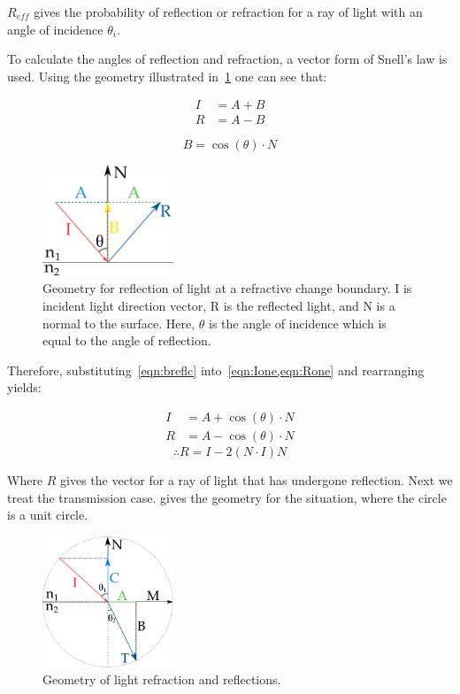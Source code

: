 \begin{appendices}
$R_{eff}$ gives the probability of reflection or refraction for a ray of light with an angle of incidence $\theta_i$.


To calculate the angles of reflection and refraction, a vector form of Snell's law is used.
Using the geometry illustrated in~\cref{fig:reflcfig} one can see that:

\begin{align}
I &= A+B\label{eqn:Ione}\\
R &= A-B\label{eqn:Rone}
\end{align}

\begin{equation}
B=\cos(\theta)\cdot N
\label{eqn:breflc}
\end{equation}

\begin{figure}[!htpb]
    \centering
    \includegraphics[width=0.35\textwidth]{reflc.pdf}
    \caption{Geometry for reflection of light at a refractive change boundary. I is incident light direction vector, R is the reflected light, and N is a normal to the surface. Here, $\theta$ is the angle of incidence which is equal to the angle of reflection.}
    \label{fig:reflcfig}
\end{figure}

Therefore, substituting~\cref{eqn:breflc} into~\cref{eqn:Ione,eqn:Rone} and rearranging yields:

\begin{align}
I&=A+\cos\left(\theta\right)\cdot N\\
R&=A-\cos\left(\theta\right)\cdot N
\end{align}
\begin{equation}
\therefore R=I-2(N\cdot I) N\label{eqn:reflcfin}
\end{equation}

Where $R$ gives the vector for a ray of light that has undergone reflection.
Next we treat the transmission case.
 gives the geometry for the situation, where the circle is a unit circle.

\begin{figure}[!htpb]
    \centering
    \includegraphics[width=0.35\textwidth]{trans.pdf}
    \caption{Geometry of light refraction and reflections.}
    \label{fig:transfig}
\end{figure}


\end{appendices}
